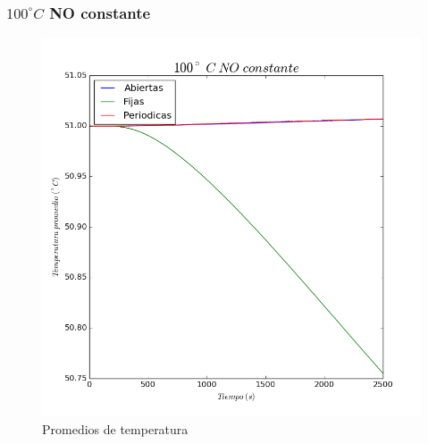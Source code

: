 \documentclass{article}
\begin{document}
\subsubsection{$100^\circ C$ NO constante}
\begin{figure}[H]
\includegraphics[width=\linewidth]{promCaso2.png}
\caption{Promedios de temperatura}
\end{figure}
\end{document}
